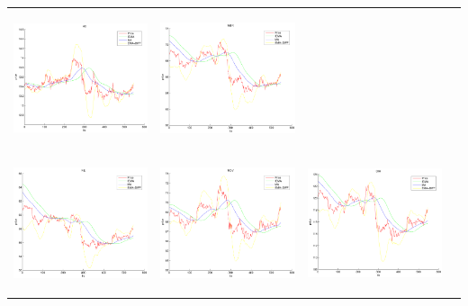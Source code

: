 \begin{tabular}{ |c|c|c|c| }
\includegraphics[width=4.0cm,height=4.0cm]{images/RealTimeFinancialTSMining/klTimeSeries/HCFilteredPriceSeries.pdf}   &
\includegraphics[width=4.0cm,height=4.0cm]{images/RealTimeFinancialTSMining/klTimeSeries/NBRFilteredPriceSeries.pdf}  \\
\includegraphics[width=4.0cm,height=4.0cm]{images/RealTimeFinancialTSMining/klTimeSeries/NEFilteredPriceSeries.pdf}    &
\includegraphics[width=4.0cm,height=4.0cm]{images/RealTimeFinancialTSMining/klTimeSeries/NOVFilteredPriceSeries.pdf}   &
\includegraphics[width=4.0cm,height=4.0cm]{images/RealTimeFinancialTSMining/klTimeSeries/OIHFilteredPriceSeries.pdf}   &

\end{tabular}
